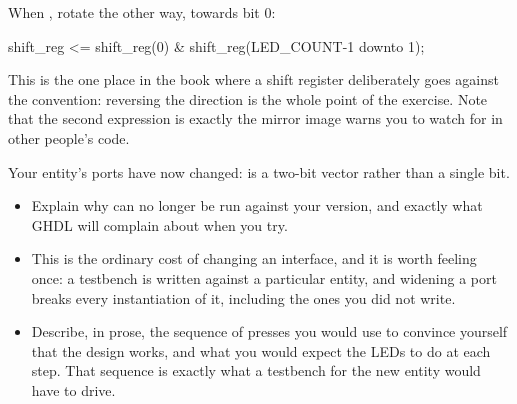 When , rotate the other way, towards bit 0:

\begin{vhdlcode}
shift_reg <= shift_reg(0) & shift_reg(LED_COUNT-1 downto 1);
\end{vhdlcode}

This is the one place in the book where a shift register deliberately goes against the convention:
reversing the direction is the whole point of the exercise. Note that the second expression is
exactly the mirror image  warns you to watch for in other people's code.

 Your entity's ports have now changed:  is a two-bit vector rather than a
single bit.
\begin{itemize}
  \item Explain why  can no longer be run against your version, and exactly
    what GHDL will complain about when you try.
  \item This is the ordinary cost of changing an interface, and it is worth feeling once: a testbench
    is written against a particular entity, and widening a port breaks every instantiation of it,
    including the ones you did not write.
  \item Describe, in prose, the sequence of presses you would use to convince yourself that the
    design works, and what you would expect the LEDs to do at each step. That sequence is exactly
    what a testbench for the new entity would have to drive.
\end{itemize}
